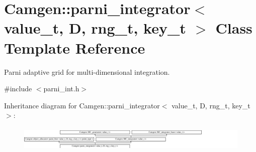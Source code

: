 \hypertarget{a00395}{}\section{Camgen\+:\+:parni\+\_\+integrator$<$ value\+\_\+t, D, rng\+\_\+t, key\+\_\+t $>$ Class Template Reference}
\label{a00395}


Parni adaptive grid for multi-\/dimensional integration.  




{\ttfamily \#include $<$parni\+\_\+int.\+h$>$}

Inheritance diagram for Camgen\+:\+:parni\+\_\+integrator$<$ value\+\_\+t, D, rng\+\_\+t, key\+\_\+t $>$\+:\begin{figure}[H]
\begin{center}
\leavevmode
\includegraphics[height=1.209503cm]{a00395}
\end{center}
\end{figure}
